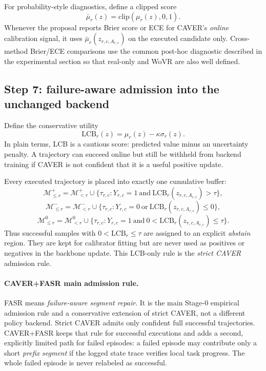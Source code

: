 \documentclass[10pt]{article}
\theoremstyle{plain}
\theoremstyle{definition}
\theoremstyle{remark}
\newcommand{\LCB}{\mathrm{LCB}}
\begin{document}
For probability-style diagnostics, define a clipped score
\[
\bar\mu_r(z)=\mathrm{clip}(\mu_r(z),0,1).
\]
Whenever the proposal reports Brier score or ECE for CAVER's \emph{online} calibration signal, it uses $\bar\mu_r(z_{r,c,A_{r,c}})$ on the executed candidate only. Cross-method Brier/ECE comparisons use the common post-hoc diagnostic described in the experimental section so that real-only and WoVR are also well defined.

\subsection{Step 7: failure-aware admission into the unchanged backend}
Define the conservative utility
\[
\LCB_r(z)=\mu_r(z)-\kappa\sigma_r(z).
\]
In plain terms, LCB is a cautious score: predicted value minus an uncertainty penalty. A trajectory can succeed online but still be withheld from backend training if CAVER is not confident that it is a useful positive update.

Every executed trajectory is placed into exactly one cumulative buffer:
\[
\mathcal M_{\le r}^{+}
=
\mathcal M_{< r}^{+}\cup
\big\{\tau_{r,c}:Y_{r,c}=1\ \text{and}\ \LCB_r(z_{r,c,A_{r,c}})>\tau\big\},
\]
\[
\mathcal M_{\le r}^{-}
=
\mathcal M_{< r}^{-}\cup
\big\{\tau_{r,c}:Y_{r,c}=0\ \text{or}\ \LCB_r(z_{r,c,A_{r,c}})\le 0\big\},
\]
\[
\mathcal M_{\le r}^{0}
=
\mathcal M_{< r}^{0}\cup
\big\{\tau_{r,c}:Y_{r,c}=1\ \text{and}\ 0<\LCB_r(z_{r,c,A_{r,c}})\le\tau\big\}.
\]
Thus successful samples with $0<\LCB_r\le\tau$ are assigned to an explicit \emph{abstain} region. They are kept for calibrator fitting but are never used as positives or negatives in the backbone update. This LCB-only rule is the \emph{strict CAVER} admission rule.

\paragraph{CAVER+FASR main admission rule.}
FASR means \emph{failure-aware segment repair}. It is the main Stage-0 empirical admission rule and a conservative extension of strict CAVER, not a different policy backend. Strict CAVER admits only confident full successful trajectories. CAVER+FASR keeps that rule for successful executions and adds a second, explicitly limited path for failed episodes: a failed episode may contribute only a short \emph{prefix segment} if the logged state trace verifies local task progress. The whole failed episode is never relabeled as successful.
\end{document}
